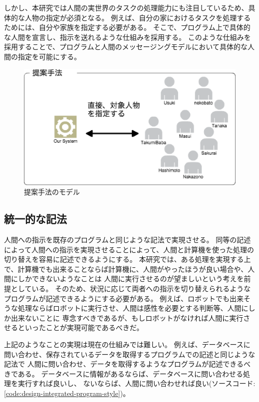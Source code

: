 しかし、本研究では人間の実世界のタスクの処理能力にも注目しているため、具体的な人物の指定が必須となる。
例えば、自分の家におけるタスクを処理するためには、自分や家族を指定する必要がある。
そこで、プログラム上で具体的な人間を宣言し、指示を送れるような仕組みを採用する。
このような仕組みを採用することで、プログラムと人間のメッセージングモデルにおいて具体的な人間の指定を可能にする。

\begin{figure}[htbp]
  \begin{center}
  \includegraphics[width=.5\linewidth]{images/unique_id_model.eps}
  \end{center}
  \caption{提案手法のモデル}
  \label{fig:unique_id_model}
\end{figure}

\subsection{統一的な記法}\label{ux7d71ux4e00ux7684ux306aux8a18ux6cd5}

人間への指示を既存のプログラムと同じような記法で実現させる。
同等の記述によって人間への指示を実現させることによって、人間と計算機を使った処理の切り替えを容易に記述できるようにする。
本研究では、ある処理を実現する上で、計算機でも出来ることならば計算機に、人間がやったほうが良い場合や、人間にしかできないようなことは
人間に実行させるのが望ましいという考えを前提としている。
そのため、状況に応じて両者への指示を切り替えられるようなプログラムが記述できるようにする必要がある。
例えば、ロボットでも出来そうな処理ならばロボットに実行させ、人間は感性を必要とする判断等、人間にしか出来ないことに
専念すべきであるが、もしロボットがなければ人間に実行させるといったことが実現可能であるべきだ。

上記のようなことの実現は現在の仕組みでは難しい。
例えば、データベースに問い合わせ、保存されているデータを取得するプログラムでの記述と同じような記法で
人間に問い合わせ、データを取得するようなプログラムが記述できるべきである。
データベースに情報があるならば、データベースに問い合わせる処理を実行すれば良いし、
ないならば、人間に問い合わせれば良い(ソースコード:\ref{code:design-integrated-program-style})。

